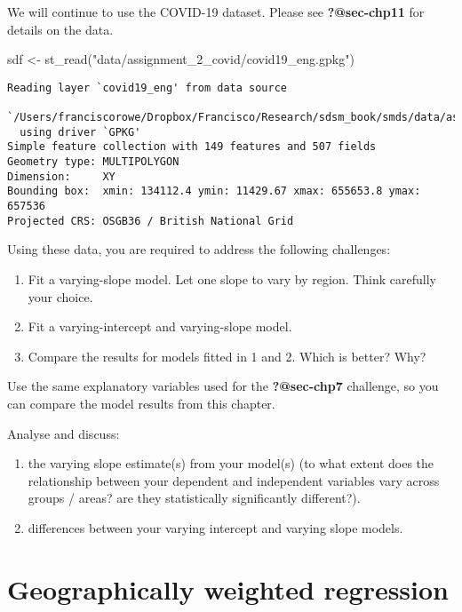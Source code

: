 \documentclass[
  letterpaper,
  krantz2]{style/krantz}
\newenvironment{Shaded}{\begin{snugshade}}{\end{snugshade}}
\newcommand{\FunctionTok}[1]{\textcolor[rgb]{0.28,0.35,0.67}{#1}}
\newcommand{\NormalTok}[1]{\textcolor[rgb]{0.00,0.23,0.31}{#1}}
\newcommand{\OtherTok}[1]{\textcolor[rgb]{0.00,0.23,0.31}{#1}}
\newcommand{\StringTok}[1]{\textcolor[rgb]{0.13,0.47,0.30}{#1}}
\providecommand{\tightlist}{%
  \setlength{\itemsep}{0pt}\setlength{\parskip}{0pt}}\usepackage{longtable,booktabs,array}
\begin{document}
We will continue to use the COVID-19 dataset. Please see
\textbf{?@sec-chp11} for details on the data.

\begin{Shaded}
\begin{Highlighting}[]
\NormalTok{sdf }\OtherTok{\textless{}{-}} \FunctionTok{st\_read}\NormalTok{(}\StringTok{"data/assignment\_2\_covid/covid19\_eng.gpkg"}\NormalTok{)}
\end{Highlighting}
\end{Shaded}

\begin{verbatim}
Reading layer `covid19_eng' from data source 
  `/Users/franciscorowe/Dropbox/Francisco/Research/sdsm_book/smds/data/assignment_2_covid/covid19_eng.gpkg' 
  using driver `GPKG'
Simple feature collection with 149 features and 507 fields
Geometry type: MULTIPOLYGON
Dimension:     XY
Bounding box:  xmin: 134112.4 ymin: 11429.67 xmax: 655653.8 ymax: 657536
Projected CRS: OSGB36 / British National Grid
\end{verbatim}

Using these data, you are required to address the following challenges:

\begin{enumerate}
\def\labelenumi{\arabic{enumi}.}
\item
  Fit a varying-slope model. Let one slope to vary by region. Think
  carefully your choice.
\item
  Fit a varying-intercept and varying-slope model.
\item
  Compare the results for models fitted in 1 and 2. Which is better?
  Why?
\end{enumerate}

Use the same explanatory variables used for the \textbf{?@sec-chp7}
challenge, so you can compare the model results from this chapter.

Analyse and discuss:

\begin{enumerate}
\def\labelenumi{\arabic{enumi}.}
\tightlist
\item
  the varying slope estimate(s) from your model(s) (to what extent does
  the relationship between your dependent and independent variables vary
  across groups / areas? are they statistically significantly
  different?).
\item
  differences between your varying intercept and varying slope models.
\end{enumerate}

\hypertarget{geographically-weighted-regression}{%
\chapter{Geographically weighted
regression}\label{geographically-weighted-regression}}
\end{document}
